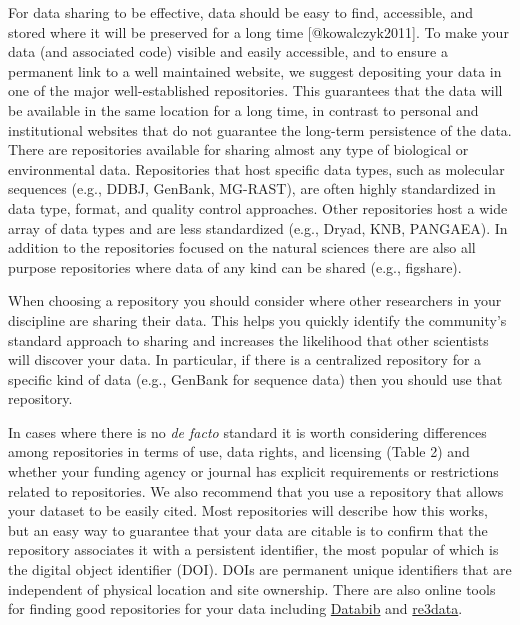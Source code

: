 For data sharing to be effective, data should be easy to find,
accessible, and stored where it will be preserved for a long time
{[}@kowalczyk2011{]}. To make your data (and associated code) visible
and easily accessible, and to ensure a permanent link to a well
maintained website, we suggest depositing your data in one of the major
well-established repositories. This guarantees that the data will be
available in the same location for a long time, in contrast to personal
and institutional websites that do not guarantee the long-term
persistence of the data. There are repositories available for sharing
almost any type of biological or environmental data. Repositories that
host specific data types, such as molecular sequences (e.g., DDBJ,
GenBank, MG-RAST), are often highly standardized in data type, format,
and quality control approaches. Other repositories host a wide array of
data types and are less standardized (e.g., Dryad, KNB, PANGAEA). In
addition to the repositories focused on the natural sciences there are
also all purpose repositories where data of any kind can be shared
(e.g., figshare).

When choosing a repository you should consider where other researchers
in your discipline are sharing their data. This helps you quickly
identify the community's standard approach to sharing and increases the
likelihood that other scientists will discover your data. In particular,
if there is a centralized repository for a specific kind of data (e.g.,
GenBank for sequence data) then you should use that repository.

In cases where there is no \emph{de facto} standard it is worth
considering differences among repositories in terms of use, data rights,
and licensing (Table 2) and whether your funding agency or journal has
explicit requirements or restrictions related to repositories. We also
recommend that you use a repository that allows your dataset to be
easily cited. Most repositories will describe how this works, but an
easy way to guarantee that your data are citable is to confirm that the
repository associates it with a persistent identifier, the most popular
of which is the digital object identifier (DOI). DOIs are permanent
unique identifiers that are independent of physical location and site
ownership. There are also online tools for finding good repositories for
your data including \href{http://databib.org}{Databib} and
\href{http://re3data.org}{re3data}.

